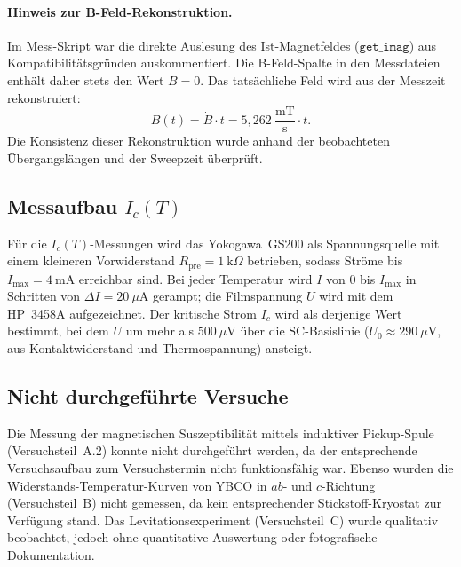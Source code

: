 \paragraph{Hinweis zur B-Feld-Rekonstruktion.}
Im Mess-Skript war die direkte Auslesung des Ist-Magnetfeldes ($\mathtt{get\_imag}$) aus Kompatibilitätsgründen auskommentiert.
Die B-Feld-Spalte in den Messdateien enthält daher stets den Wert $B = 0$.
Das tatsächliche Feld wird aus der Messzeit rekonstruiert:
\begin{equation}
    B(t) = \dot{B} \cdot t = 5{,}262~\frac{\mathrm{mT}}{\mathrm{s}} \cdot t.
    \label{eq:b_recon}
\end{equation}
Die Konsistenz dieser Rekonstruktion wurde anhand der beobachteten Übergangslängen und der Sweepzeit überprüft.

\subsection{Messaufbau $I_c(T)$}

Für die $I_c(T)$-Messungen wird das Yokogawa~GS200 als Spannungsquelle mit einem kleineren Vorwiderstand $R_\mathrm{pre} = 1~\mathrm{k}\Omega$ betrieben, sodass Ströme bis $I_\mathrm{max} = 4~\mathrm{mA}$ erreichbar sind.
Bei jeder Temperatur wird $I$ von $0$ bis $I_\mathrm{max}$ in Schritten von $\Delta I = 20~\mu\mathrm{A}$ gerampt; die Filmspannung $U$ wird mit dem HP~3458A aufgezeichnet.
Der kritische Strom $I_c$ wird als derjenige Wert bestimmt, bei dem $U$ um mehr als $500~\mu\mathrm{V}$ über die SC-Basislinie ($U_0 \approx 290~\mu\mathrm{V}$, aus Kontaktwiderstand und Thermospannung) ansteigt.

\subsection{Nicht durchgeführte Versuche}

Die Messung der magnetischen Suszeptibilität mittels induktiver Pickup-Spule (Versuchsteil~A.2) konnte nicht durchgeführt werden, da der entsprechende Versuchsaufbau zum Versuchstermin nicht funktionsfähig war.
Ebenso wurden die Widerstands-Temperatur-Kurven von YBCO in $ab$- und $c$-Richtung (Versuchsteil~B) nicht gemessen, da kein entsprechender Stickstoff-Kryostat zur Verfügung stand.
Das Levitationsexperiment (Versuchsteil~C) wurde qualitativ beobachtet, jedoch ohne quantitative Auswertung oder fotografische Dokumentation.
